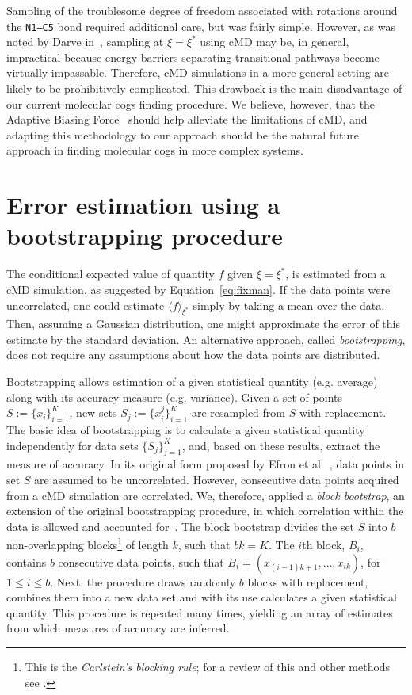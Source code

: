 \documentclass[a4paper,11pt,twoside]{book}%
\begin{document}
\begin{appendices}
Sampling of the troublesome degree of freedom associated with rotations around the \texttt{N1--C5} bond required additional care, but was fairly simple.
However, as was noted by Darve in~\cite{tuckerman2007free}, sampling at $\xi=\xi^*$ using cMD may be, in general, impractical because energy barriers separating transitional pathways become virtually impassable.
Therefore, cMD simulations in a more general setting are likely to be prohibitively complicated.
This drawback is the main disadvantage of our current molecular cogs finding procedure.
We believe, however, that the Adaptive Biasing Force~\cite{tuckerman2007free} should help alleviate the limitations of cMD, and adapting this methodology to our approach should be the natural future approach in finding molecular cogs in more complex systems.

\section{Error estimation using a bootstrapping procedure}\label{sec:bootstrapping}
The conditional expected value of quantity $f$ given $\xi=\xi^*$, is estimated from a cMD simulation, {\color{black}as suggested by Equation~\ref{eq:fixman}.}
If the data points were uncorrelated, one could estimate $\langle f \rangle_{\xi^*}$ simply by taking a mean over the data.
Then, assuming a Gaussian distribution, one might approximate the error of this estimate by the standard deviation.
An alternative approach, called \emph{bootstrapping}, does not require any assumptions about how the data points are distributed.

Bootstrapping allows estimation of a given statistical quantity (e.g. average) along with its accuracy measure (e.g. variance).
Given a set of points \mbox{$S:=\{ x_i \}_{i=1}^K$}, new sets \mbox{$S_j:=\{ x_i^j \}_{i=1}^{K}$} are resampled from $S$ with replacement.
The basic idea of bootstrapping is to calculate a given statistical quantity independently for data sets $\{ S_j \}_{j=1}^K$, and, based on these results, extract the measure of accuracy. 
In its original form proposed by Efron et al.~\cite{efron1992bootstrap}, data points in set $S$ are assumed to be uncorrelated.
However, consecutive data points acquired from a cMD simulation are correlated.
We, therefore, applied a \emph{block bootstrap}, an extension of the original bootstrapping procedure, in which correlation within the data is allowed and accounted for~\cite{carlstein1986use}.
The block bootstrap divides the set $S$ into $b$ non-overlapping blocks\footnote{This is the \emph{Carlstein's blocking rule}; for a review of this and other methods see \cite{hall1995blocking,kreiss2011bootstrap}.} of length $k$, such that $bk=K$. 
The $i$th block, $B_i$, contains $b$ consecutive data points, such that $B_i=( x_{(i-1)k+1},\ldots,x_{ik} )$, for $1\leq i\leq b$.
Next, the procedure draws randomly $b$ blocks with replacement, combines them into a new data set and with its use calculates a given statistical quantity.
This procedure is repeated many times, yielding an array of estimates from which measures of accuracy are inferred.


\end{appendices}
\end{document}
